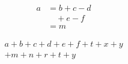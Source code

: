 \documentclass{article} %
\begin{document}
\begin{align*}
	a &= b + c - d\\
	&\quad + e - f\\
	&= m
\end{align*}

\bigskip
\begin{minipage}{5cm}
\begin{multline*}
	a+b+c+d+e+f+t+x+y\\
	+m+n+r+t+y
\end{multline*}
\end{minipage}
\end{document}

